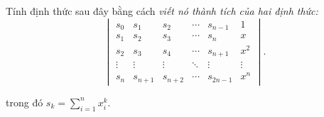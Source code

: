 \documentclass[class=nhvh-linear-algebra,crop=false]{standalone}
\begin{document}
\begin{exercise}
    \par Tính định thức sau đây bằng cách \textit{viết nó thành tích của hai định thức:}
    \[
        \begin{vmatrix}
            s_{0}  & s_{1}   & s_{2}   & \cdots & s_{n-1}  & 1      \\
            s_{1}  & s_{2}   & s_{3}   & \cdots & s_{n}    & x      \\
            s_{2}  & s_{3}   & s_{4}   & \cdots & s_{n+1}  & x^{2}  \\
            \vdots & \vdots  & \vdots  & \ddots & \vdots   & \vdots \\
            s_{n}  & s_{n+1} & s_{n+2} & \cdots & s_{2n-1} & x^{n}
        \end{vmatrix}.
    \]
    \par trong đó $s_{k} = \displaystyle\sum^{n}_{i=1}x_{i}^{k}$.
\end{exercise}
\end{document}
